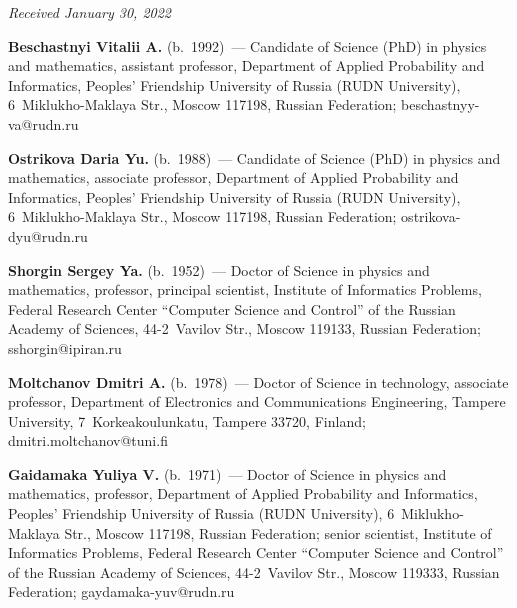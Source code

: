 \vspace*{-6pt}

\hfill{\small\textit{Received January 30, 2022}}


  
  \Contr
  
  \noindent
  \textbf{Beschastnyi Vitalii A.} (b.\ 1992)~--- Candidate of Science (PhD) in physics and mathematics, 
assistant professor, Department of Applied Probability and Informatics, Peoples' Friendship 
University of Russia (RUDN University), 6~Miklukho-Maklaya Str., Moscow 117198, Russian 
Federation; \mbox{beschastnyy-va@rudn.ru}

\vspace*{3pt}
  
    \noindent
  \textbf{Ostrikova Daria Yu.} (b.\ 1988)~--- Candidate of Science (PhD) in physics and mathematics, 
associate professor, Department of Applied Probability and Informatics, Peoples' Friendship 
University of Russia (RUDN University), 6~Miklukho-Maklaya Str., Moscow 117198, Russian 
Federation; \mbox{ostrikova-dyu@rudn.ru}

\vspace*{3pt}
  
    \noindent
  \textbf{Shorgin Sergey Ya.} (b.\ 1952)~--- Doctor of Science in physics and mathematics, professor, 
principal scientist, Institute of Informatics Problems, Federal Research Center ``Computer Science 
and Control'' of the Russian Academy of Sciences, 44-2~Vavilov Str., Moscow 119133, Russian 
Federation; \mbox{sshorgin@ipiran.ru}

\vspace*{3pt}
  
   \noindent
  \textbf{Moltchanov Dmitri A.} (b.\ 1978)~--- Doctor of Science in technology, associate professor, 
Department of Electronics and Communications Engineering, Tampere University,
 7~Korkeakoulunkatu, Tampere 33720, Finland; \mbox{dmitri.moltchanov@tuni.fi}
 
 \vspace*{3pt}
  
  
    \noindent
  \textbf{Gaidamaka Yuliya V.} (b.\ 1971)~--- Doctor of Science in physics and mathematics, professor, 
Department of Applied Probability and Informatics, Peoples' Friendship University of Russia 
(RUDN University), 6~Miklukho-Maklaya Str., Moscow 117198, Russian Federation; senior 
scientist, Institute of Informatics Problems, Federal Research Center ``Computer Science and 
Control'' of the Russian Academy of Sciences, 44-2~Vavilov Str., Moscow 119333, Russian 
Federation; \mbox{gaydamaka-yuv@rudn.ru}
  

\label{end\stat}

\renewcommand{\bibname}{\protect\rm Литература} 
  